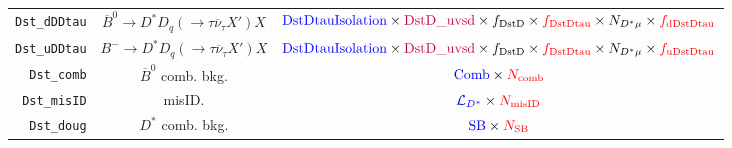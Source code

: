 \begin{landscape}
\begin{table}
\begin{tabular}{r|c|c}
  \texttt{Dst\_dDDtau} & $\overline{B}^0 \rightarrow D^* D_q (\rightarrow \tau \overline{\nu}_\tau X') X$  &                                                                                $\textcolor{blue}{\text{DstDtauIsolation}} \times \textcolor{purple}{\text{DstD\_uvsd}} \times f_\text{DstD} \times \textcolor{red}{f_\text{DstDtau}} \times N_{D^* \mu} \times \textcolor{red}{f_\text{dDstDtau}}$                                                                                 \\
  \texttt{Dst\_uDDtau} &       $B^- \rightarrow D^* D_q (\rightarrow \tau \overline{\nu}_\tau X') X$       &                                                                                $\textcolor{blue}{\text{DstDtauIsolation}} \times \textcolor{purple}{\text{DstD\_uvsd}} \times f_\text{DstD} \times \textcolor{red}{f_\text{DstDtau}} \times N_{D^* \mu} \times \textcolor{red}{f_\text{uDstDtau}}$                                                                                 \\
    \texttt{Dst\_comb} &                            $\overline{B}^0$ comb. bkg.                            &                                                                                                                                                       $\textcolor{blue}{\text{Comb}} \times \textcolor{red}{N_\text{comb}}$                                                                                                                                                        \\
   \texttt{Dst\_misID} &                                      misID.                                       &                                                                                                                                                    $\textcolor{blue}{\mathcal{L}_{D^*}} \times \textcolor{red}{N_\text{misID}}$                                                                                                                                                    \\
    \texttt{Dst\_doug} &                                 $D^*$ comb. bkg.                                  &                                                                                                                                                         $\textcolor{blue}{\text{SB}} \times \textcolor{red}{N_\text{SB}}$                                                                                                                                                          \\
\bottomrule
\end{tabular}

\end{table}
\end{landscape}

